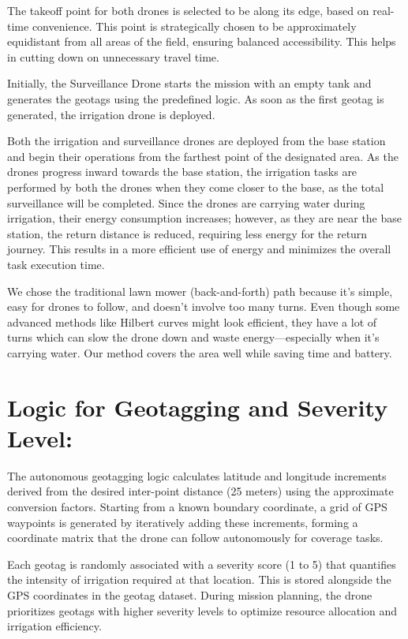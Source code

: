 \documentclass[12pt]{article}
\begin{document}
The takeoff point for both drones is selected to be along its edge, based on real-time convenience. This point is strategically chosen to be approximately equidistant from all areas of the field, ensuring balanced accessibility. This helps in cutting down on unnecessary travel time.

Initially, the Surveillance Drone starts the mission with an empty tank and generates the geotags using the predefined logic. As soon as the first geotag is generated, the irrigation drone is deployed.

Both the irrigation and surveillance drones are deployed from the base station and begin their operations from the farthest point of the designated area. As the drones progress inward towards the base station, the irrigation tasks are performed by both the drones when they come closer to the base, as the total surveillance will be completed. Since the drones are carrying water during irrigation, their energy consumption increases; however, as they are near the base station, the return distance is reduced, requiring less energy for the return journey. This results in a more efficient use of energy and minimizes the overall task execution time.

We chose the traditional lawn mower (back-and-forth) path because it's simple, easy for drones to follow, and doesn't involve too many turns. Even though some advanced methods like Hilbert curves might look efficient, they have a lot of turns which can slow the drone down and waste energy—especially when it's carrying water. Our method covers the area well while saving time and battery.

\section*{Logic for Geotagging and Severity Level:}
The autonomous geotagging logic calculates latitude and longitude increments derived from the desired inter-point distance (25 meters) using the approximate conversion factors. Starting from a known boundary coordinate, a grid of GPS waypoints is generated by iteratively adding these increments, forming a coordinate matrix that the drone can follow autonomously for coverage tasks.

Each geotag is randomly associated with a severity score (1 to 5) that quantifies the intensity of irrigation required at that location. This is stored alongside the GPS coordinates in the geotag dataset. During mission planning, the drone prioritizes geotags with higher severity levels to optimize resource allocation and irrigation efficiency.
\end{document}
